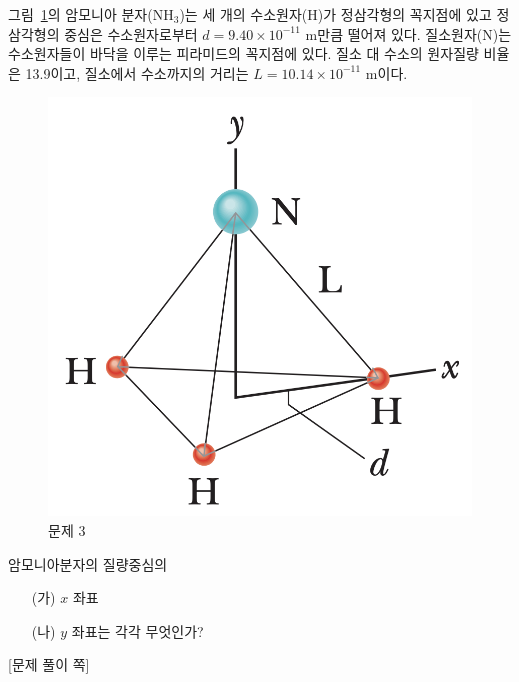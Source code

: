 \documentclass[floatfix,nofootinbib,superscriptaddress,fleqn,preprint]{revtex4}
\begin{document}
그림~\ref{fig:3}의 암모니아 분자($\mathrm{NH}_3$)는 세 개의
수소원자(H)가 정삼각형의 꼭지점에 있고 정삼각형의 중심은
수소원자로부터 $d=9.40\times 10^{-11}$ m만큼 떨어져
있다. 질소원자(N)는 수소원자들이 바닥을 이루는 피라미드의 꼭지점에
있다. 질소 대 수소의 원자질량 비율은 13.9이고, 질소에서 수소까지의
거리는 $L=10.14\times 10^{-11}$ m이다. 
\begin{figure}[ht]
  \centering
\includegraphics[scale=0.3]{Qfig9-4-20220330.png}  
  \caption{문제 3}
  \label{fig:3}
\end{figure}
암모니아분자의 질량중심의
\begin{itemize}
\item[(가)] $x$ 좌표
\item[(나)] $y$ 좌표는 각각 무엇인가? 
\end{itemize}
\newpage
{\color{gray} [문제 풀이 쪽]}

\newpage
\end{document}
